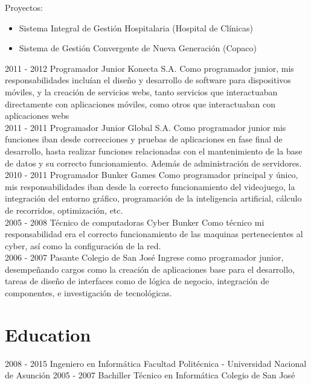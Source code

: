 \documentclass[]{friggeri-cv}
\begin{document}
\begin{entrylist}
{        Proyectos:
        \begin{itemize}
            \item Sistema Integral de Gestión Hospitalaria (Hospital de
                Clínicas)
            \item Sistema de Gestión Convergente de Nueva Generación (Copaco)
        \end{itemize}}
\entry
    {2011 - 2012}
    {Programador Junior}
    {Konecta S.A.}
    {Como programador junior, mis responsabilidades incluían el diseño y
        desarrollo de software para dispositivos móviles, y la creación de
        servicios webs, tanto servicios que interactuaban directamente con
        aplicaciones móviles, como otros que interactuaban con aplicaciones webs
        \\}
\entry
    {2011 - 2011}
    {Programador Junior}
    {Global S.A.}
    {Como programador junior mis funciones iban desde correcciones y pruebas de
        aplicaciones en fase final de desarrollo, hasta realizar funciones
        relacionadas con el mantenimiento de la base de datos y su correcto
        funcionamiento. Además de administración de servidores. \\}
\entry
    {2010 - 2011}
    {Programador}
    {Bunker Games}
    {Como programador principal y único, mis responsabilidades iban desde la
        correcto funcionamiento del videojuego, la integración del entorno
        gráfico, programación de la inteligencia artificial, cálculo de
        recorridos, optimización, etc. \\}
\entry
    {2005 - 2008}
    {Técnico de computadoras}
    {Cyber Bunker}
    {Como técnico mi responsabilidad era el correcto funcionamiento de las
        maquinas pertenecientes al cyber, así como la configuración de la red.
        \\}
\entry
    {2006 - 2007}
    {Pasante}
    {Colegio de San José}
    {Ingrese como programador junior, desempeñando cargos como la
creación de aplicaciones base para el desarrollo, tareas de diseño de
interfaces como de lógica de negocio, integración de componentes, e
investigación de tecnológicas. \\}

\end{entrylist}

\section{Education}
\begin{entrylist}
  \entry
    {2008 - 2015}
    {Ingeniero en Informática}
    {Facultad Politécnica - Universidad Nacional de Asunción}
    {}
  \entry
    {2005 - 2007}
    {Bachiller Técnico en Informática}
    {Colegio de San José}
    {}
\end{entrylist}
\end{document}
